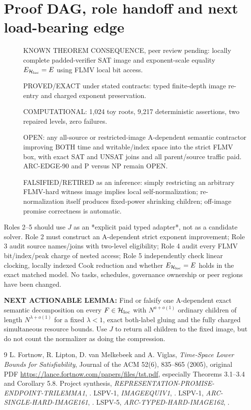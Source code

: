 \documentclass[11pt]{article}
\begin{document}
\section{Proof DAG, role handoff and next load-bearing edge}
\begin{description}
\item[] KNOWN THEOREM CONSEQUENCE, peer review pending: locally complete padded-verifier SAT image and exponent-scale equality $E_{\mathcal H_{\rm loc}}=E$ using FLMV local bit access.
\item[] PROVED/EXACT under stated contracts: typed finite-depth image re-entry and charged exponent preservation.
\item[] COMPUTATIONAL: 1,024 toy roots, 9,217 deterministic assertions, two repaired levels, zero failures.
\item[] OPEN: any all-source or restricted-image A-dependent semantic contractor improving BOTH time and writable/index space into the strict FLMV box, with exact SAT and UNSAT joins and all parent/source traffic paid. ARC-EDGE-90 and P versus NP remain OPEN.
\item[] FALSIFIED/RETIRED as an inference: simply restricting an arbitrary FLMV-hard witness image implies local self-normalization; re-normalization itself produces fixed-power shrinking children; off-image promise correctness is automatic.
\end{description}
Roles 2--5 should use $J$ as an *explicit paid typed adapter*, not as a candidate solver. Role 2 must construct an A-dependent strict exponent improvement; Role 3 audit source names/joins with two-level eligibility; Role 4 audit every FLMV bit/index/peak charge of nested access; Role 5 independently check linear clocking, locally indexed Cook reduction and whether $E_{\mathcal H_{\rm loc}}=E$ holds in the exact matched model. No tasks, schedules, governance ownership or peer regions have been changed.

\textbf{NEXT ACTIONABLE LEMMA:} Find or falsify one A-dependent exact semantic decomposition on every $F\in\mathcal H_{\rm loc}$ with $N^{a+o(1)}$ ordinary children of length $N^{\lambda+o(1)}$ for a fixed $\lambda<1$, exact both-label gluing and the fully charged simultaneous resource bounds. Use $J$ to return all children to the fixed image, but do not count the normalizer as doing the compression.

\begin{thebibliography}{9}
 L. Fortnow, R. Lipton, D. van Melkebeek and A. Viglas, \emph{Time-Space Lower Bounds for Satisfiability}, Journal of the ACM 52(6), 835--865 (2005), original PDF \url{https://lance.fortnow.com/papers/files/tst.pdf}, especially Theorems 3.1--3.4 and Corollary 5.8.
 Project synthesis, \emph{REPRESENTATION-PROMISE-ENDPOINT-TRILEMMA1}, .
 LSPV-1, \emph{IMAGEEQUIV1}, .
 LSPV-1, \emph{ARC-SINGLE-HARD-IMAGE161}, .
 LSPV-5, \emph{ARC-TYPED-HARD-IMAGE162}, .
\end{thebibliography}
\end{document}
